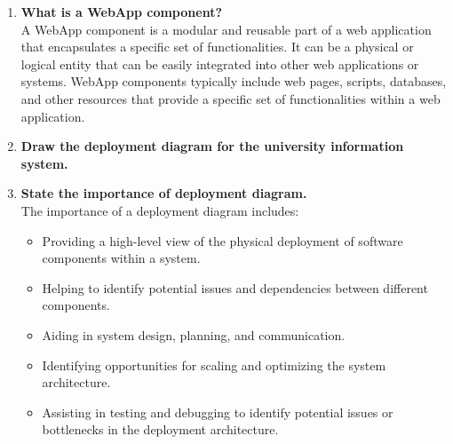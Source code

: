 \documentclass[11pt]{article}
\begin{document}
\begin{enumerate}
	\item \textbf{What is a WebApp component?}\\

	A WebApp component is a modular and reusable part of a web application that encapsulates a specific set of functionalities. It can be a physical or logical entity that can be easily integrated into other web applications or systems. WebApp components typically include web pages, scripts, databases, and other resources that provide a specific set of functionalities within a web application.

	\item \textbf{Draw the deployment diagram for the university information system.}\\

	\item \textbf{State the importance of deployment diagram.}\\
	      The importance of a deployment diagram includes:
	      \begin{itemize}
		      \item Providing a high-level view of the physical deployment of software components within a system.
		      \item Helping to identify potential issues and dependencies between different components.
		      \item Aiding in system design, planning, and communication.
		      \item Identifying opportunities for scaling and optimizing the system architecture.
		      \item Assisting in testing and debugging to identify potential issues or bottlenecks in the deployment architecture.
	      \end{itemize}

\end{enumerate}
\end{document}
